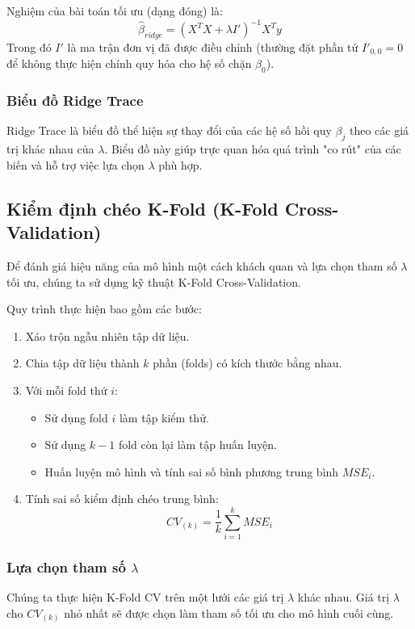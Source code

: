 Nghiệm của bài toán tối ưu (dạng đóng) là:
\begin{equation}
    \hat{\beta}_{ridge} = (X^T X + \lambda I')^{-1} X^T y
\end{equation}
Trong đó $I'$ là ma trận đơn vị đã được điều chỉnh (thường đặt phần tử $I'_{0,0} = 0$ để không thực hiện chính quy hóa cho hệ số chặn $\beta_0$).

\subsubsection{Biểu đồ Ridge Trace}
Ridge Trace là biểu đồ thể hiện sự thay đổi của các hệ số hồi quy $\beta_j$ theo các giá trị khác nhau của $\lambda$. Biểu đồ này giúp trực quan hóa quá trình "co rút" của các biến và hỗ trợ việc lựa chọn $\lambda$ phù hợp.

\subsection{Kiểm định chéo K-Fold (K-Fold Cross-Validation)}

Để đánh giá hiệu năng của mô hình một cách khách quan và lựa chọn tham số $\lambda$ tối ưu, chúng ta sử dụng kỹ thuật K-Fold Cross-Validation.

Quy trình thực hiện bao gồm các bước:
\begin{enumerate}
    \item Xáo trộn ngẫu nhiên tập dữ liệu.
    \item Chia tập dữ liệu thành $k$ phần (folds) có kích thước bằng nhau.
    \item Với mỗi fold thứ $i$:
    \begin{itemize}
        \item Sử dụng fold $i$ làm tập kiểm thử.
        \item Sử dụng $k-1$ fold còn lại làm tập huấn luyện.
        \item Huấn luyện mô hình và tính sai số bình phương trung bình $MSE_i$.
    \end{itemize}
    \item Tính sai số kiểm định chéo trung bình:
    \begin{equation}
        CV_{(k)} = \frac{1}{k} \sum_{i=1}^{k} MSE_i
    \end{equation}
\end{enumerate}

\subsubsection{Lựa chọn tham số $\lambda$}
Chúng ta thực hiện K-Fold CV trên một lưới các giá trị $\lambda$ khác nhau. Giá trị $\lambda$ cho $CV_{(k)}$ nhỏ nhất sẽ được chọn làm tham số tối ưu cho mô hình cuối cùng.

